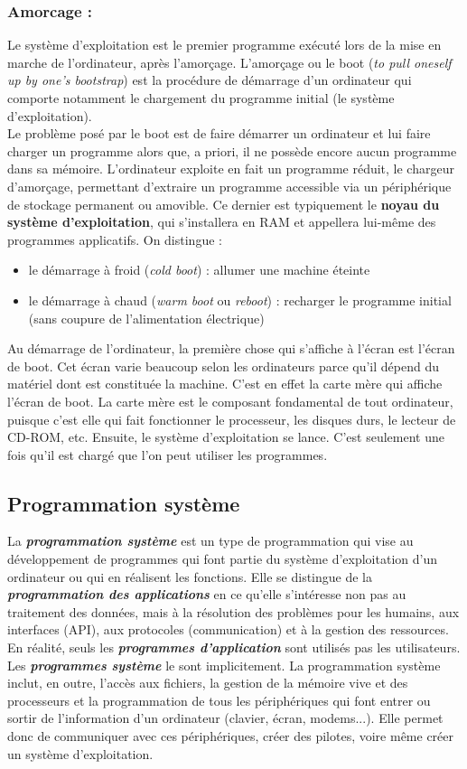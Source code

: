 		\subsubsection*{Amorcage :}
			Le système d'exploitation est le premier programme exécuté lors de la mise en marche de l'ordinateur, après l’amorçage. L’amorçage ou le boot (\textit{to pull oneself up by one’s bootstrap}) est la procédure de démarrage d’un ordinateur qui comporte notamment le chargement du programme initial (le système d'exploitation).\\
			Le problème posé par le boot est de faire démarrer un ordinateur et lui faire charger un programme alors que, a priori, il ne possède encore aucun programme dans sa mémoire. L’ordinateur exploite en fait un programme réduit, le chargeur d'amorçage, permettant d’extraire un programme accessible via un périphérique de stockage permanent ou amovible. Ce dernier est typiquement le \textbf{noyau du système d’exploitation}, qui s’installera en RAM et appellera lui-même des programmes applicatifs.
			On distingue :
			\begin{itemize}
				\item le démarrage à froid (\textit{cold boot}) : allumer une machine éteinte
				\item le démarrage à chaud (\textit{warm boot} ou \textit{reboot}) : recharger le programme initial (sans coupure de l’alimentation électrique)
			\end{itemize}
			Au démarrage de l’ordinateur, la première chose qui s'affiche à l'écran est l'écran de boot. Cet écran varie beaucoup selon les ordinateurs parce qu'il dépend du matériel dont est constituée la machine. C'est en effet la carte mère qui affiche l'écran de boot. La carte mère est le composant fondamental de tout ordinateur, puisque c'est elle qui fait fonctionner le processeur, les disques durs, le lecteur de CD-ROM, etc. Ensuite, le système d’exploitation se lance. C'est seulement une fois qu’il est chargé que l’on peut utiliser les programmes.
	
	
	\subsection{Programmation système}
		La \textit{\textbf{programmation système}} est un type de programmation qui vise au développement de programmes qui font partie du système d’exploitation d’un ordinateur ou qui en réalisent les fonctions. Elle se distingue de la \textit{\textbf{programmation des applications}} en ce qu’elle s’intéresse non pas au traitement des données, mais à la résolution des problèmes pour les humains, aux interfaces (API), aux protocoles (communication) et à la gestion des ressources.\\
		En réalité, seuls les \textit{\textbf{programmes d'application}} sont utilisés pas les utilisateurs. Les \textit{\textbf{programmes système}} le sont implicitement. La programmation système inclut, en outre, l’accès aux fichiers, la gestion de la mémoire vive et des processeurs et la programmation de tous les périphériques qui font entrer ou sortir de l’information d’un ordinateur (clavier, écran, modems...). Elle permet donc de communiquer avec ces périphériques, créer des pilotes, voire même créer un système d'exploitation.
		
